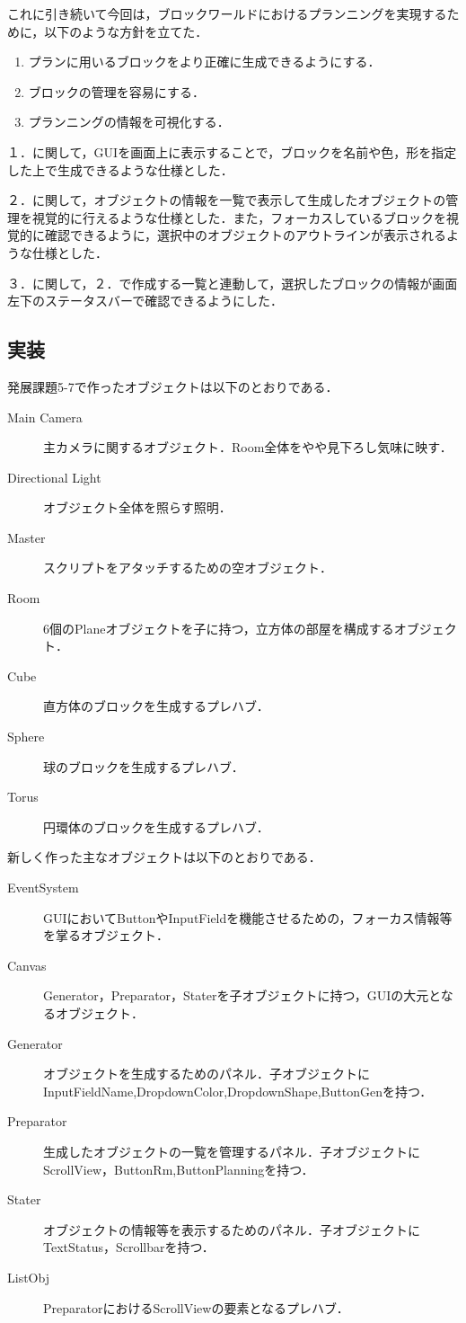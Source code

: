 \documentclass[12pt]{jarticle}
\begin{document}
これに引き続いて今回は，ブロックワールドにおけるプランニングを実現するために，以下のような方針を立てた．
\begin{enumerate}
\item プランに用いるブロックをより正確に生成できるようにする．
\item ブロックの管理を容易にする．
\item プランニングの情報を可視化する．
\end{enumerate}

１．に関して，GUIを画面上に表示することで，ブロックを名前や色，形を指定した上で生成できるような仕様とした．

２．に関して，オブジェクトの情報を一覧で表示して生成したオブジェクトの管理を視覚的に行えるような仕様とした．また，フォーカスしているブロックを視覚的に確認できるように，選択中のオブジェクトのアウトラインが表示されるような仕様とした．

３．に関して，２．で作成する一覧と連動して，選択したブロックの情報が画面左下のステータスバーで確認できるようにした．

\subsection{実装}
発展課題5-7で作ったオブジェクトは以下のとおりである．
\begin{description}
\item[Main Camera] 主カメラに関するオブジェクト．Room全体をやや見下ろし気味に映す．
\item[Directional Light] オブジェクト全体を照らす照明．
\item[Master] スクリプトをアタッチするための空オブジェクト．
\item[Room] 6個のPlaneオブジェクトを子に持つ，立方体の部屋を構成するオブジェクト．
\item[Cube] 直方体のブロックを生成するプレハブ．
\item[Sphere] 球のブロックを生成するプレハブ．
\item[Torus] 円環体のブロックを生成するプレハブ．
\end{description} 

新しく作った主なオブジェクトは以下のとおりである．
\begin{description}
\item[EventSystem] GUIにおいてButtonやInputFieldを機能させるための，フォーカス情報等を掌るオブジェクト．
\item[Canvas] Generator，Preparator，Staterを子オブジェクトに持つ，GUIの大元となるオブジェクト．
\item[Generator] オブジェクトを生成するためのパネル．子オブジェクトにInputFieldName,DropdownColor,DropdownShape,ButtonGenを持つ．
\item[Preparator] 生成したオブジェクトの一覧を管理するパネル．子オブジェクトにScrollView，ButtonRm,ButtonPlanningを持つ．
\item[Stater] オブジェクトの情報等を表示するためのパネル．子オブジェクトにTextStatus，Scrollbarを持つ．
\item[ListObj] PreparatorにおけるScrollViewの要素となるプレハブ．
\end{description} 
\end{document}
